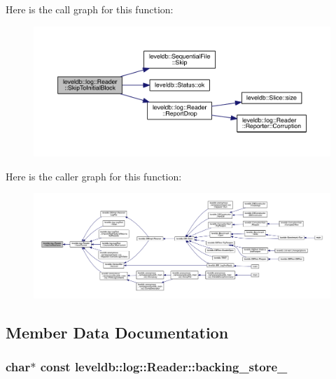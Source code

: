 Here is the call graph for this function\+:\nopagebreak
\begin{figure}[H]
\begin{center}
\leavevmode
\includegraphics[width=350pt]{classleveldb_1_1log_1_1_reader_ae11273725f413d19be1087f221a48ac7_cgraph}
\end{center}
\end{figure}




Here is the caller graph for this function\+:
\nopagebreak
\begin{figure}[H]
\begin{center}
\leavevmode
\includegraphics[width=350pt]{classleveldb_1_1log_1_1_reader_ae11273725f413d19be1087f221a48ac7_icgraph}
\end{center}
\end{figure}




\subsection{Member Data Documentation}
\hypertarget{classleveldb_1_1log_1_1_reader_ad02774743fb83dbc70d440b7f8e7e4da}{}
\subsubsection[{backing\+\_\+store\+\_\+}]{\setlength{\rightskip}{0pt plus 5cm}char$\ast$ const leveldb\+::log\+::\+Reader\+::backing\+\_\+store\+\_\+\hspace{0.3cm}{\ttfamily [private]}}\label{classleveldb_1_1log_1_1_reader_ad02774743fb83dbc70d440b7f8e7e4da}
\hypertarget{classleveldb_1_1log_1_1_reader_a1d0eee5ed5354ccd3d35fd56b2daafb6}{}
